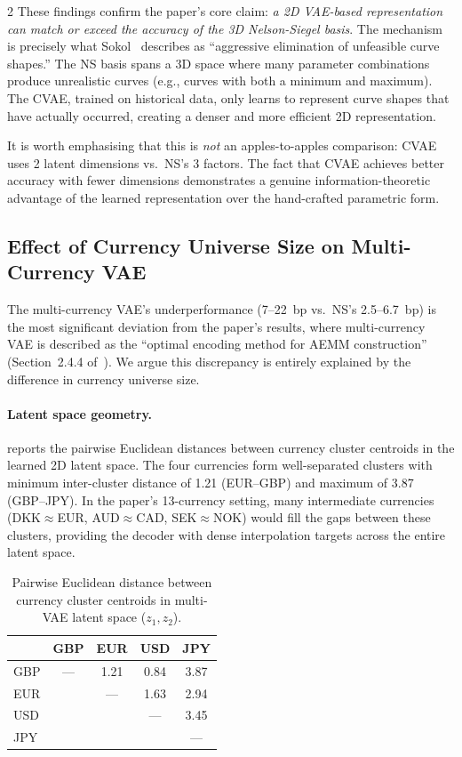\documentclass[10pt,a4paper]{article}
\theoremstyle{plain}
\theoremstyle{definition}
\begin{document}
\begin{multicols}{2}
These findings confirm the paper's core claim: \textit{a 2D VAE-based representation can match or exceed the accuracy of the 3D Nelson-Siegel basis}. The mechanism is precisely what Sokol~\cite{sokol2022} describes as ``aggressive elimination of unfeasible curve shapes.'' The NS basis spans a 3D space where many parameter combinations produce unrealistic curves (e.g., curves with both a minimum and maximum). The CVAE, trained on historical data, only learns to represent curve shapes that have actually occurred, creating a denser and more efficient 2D representation.

It is worth emphasising that this is \textit{not} an apples-to-apples comparison: CVAE uses 2 latent dimensions vs.\ NS's 3 factors. The fact that CVAE achieves better accuracy with fewer dimensions demonstrates a genuine information-theoretic advantage of the learned representation over the hand-crafted parametric form.

\subsection{Effect of Currency Universe Size on Multi-Currency VAE}\label{sec:multi_vae_size}

The multi-currency VAE's underperformance (7--22~bp vs.\ NS's 2.5--6.7~bp) is the most significant deviation from the paper's results, where multi-currency VAE is described as the ``optimal encoding method for AEMM construction'' (Section~2.4.4 of~\cite{sokol2022}). We argue this discrepancy is entirely explained by the difference in currency universe size.

\paragraph{Latent space geometry.}  reports the pairwise Euclidean distances between currency cluster centroids in the learned 2D latent space. The four currencies form well-separated clusters with minimum inter-cluster distance of 1.21 (EUR--GBP) and maximum of 3.87 (GBP--JPY). In the paper's 13-currency setting, many intermediate currencies (DKK$\approx$EUR, AUD$\approx$CAD, SEK$\approx$NOK) would fill the gaps between these clusters, providing the decoder with dense interpolation targets across the entire latent space.

\begin{table}[H]
\centering
\caption{Pairwise Euclidean distance between currency cluster centroids in multi-VAE latent space ($z_1, z_2$).}\label{tab:centroid_dist}
\begin{tabular}{lcccc}
\toprule
 & GBP & EUR & USD & JPY \\
\midrule
GBP & --- & 1.21 & 0.84 & 3.87 \\
EUR & & --- & 1.63 & 2.94 \\
USD & & & --- & 3.45 \\
JPY & & & & --- \\
\bottomrule
\end{tabular}
\end{table}


\end{multicols}
\end{document}
